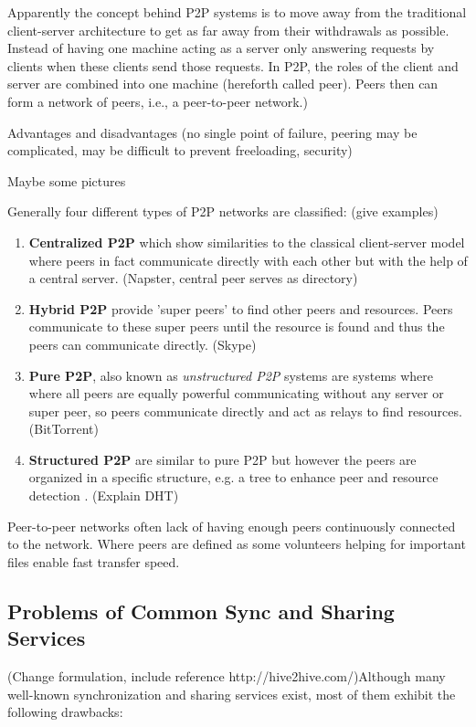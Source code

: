 Apparently the concept behind P2P systems is to move away from the traditional client-server architecture to get as far away from their withdrawals as possible. Instead of having one machine acting as a server only answering requests by clients when these clients send those requests. In P2P, the roles of the client and server are combined into one machine (hereforth called peer). Peers then can form a network of peers, i.e., a peer-to-peer network.)

Advantages and disadvantages (no single point of failure, peering may be complicated, may be difficult to prevent freeloading, security)

Maybe some pictures

Generally four different types of P2P networks are classified: (give examples)
\begin{enumerate}
	\item \textbf{Centralized P2P} which show similarities to the classical client-server model where peers in fact communicate directly with each other but with the help of a central server. (Napster, central peer serves as directory)
	\item \textbf{Hybrid P2P} provide 'super peers' to find other peers and resources. Peers communicate to these super peers until the resource is found and thus the peers can communicate directly. (Skype)
	\item \textbf{Pure P2P}, also known as \textit{unstructured P2P} systems are systems where where all peers are equally powerful communicating without any server or super peer, so peers communicate directly and act as relays to find resources. (BitTorrent)
	\item \textbf{Structured P2P} are similar to pure P2P but however the peers are organized in a specific structure, e.g. a tree to enhance peer and resource detection \cite{ptp-introduction:tomptp}. (Explain DHT)
\end{enumerate}

Peer-to-peer networks often lack of having enough peers continuously connected to the network. Where peers are defined as some volunteers helping for important files enable fast transfer speed.

\subsection{Problems of Common Sync and Sharing Services}
(Change formulation, include reference http://hive2hive.com/)Although many well-known synchronization and sharing services exist, most of them exhibit the following drawbacks:

